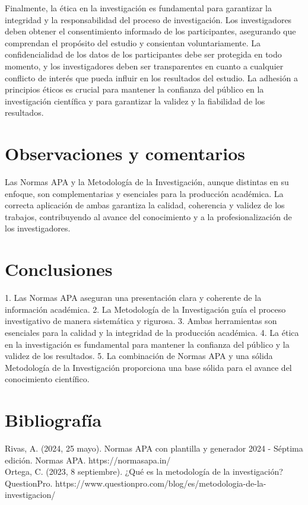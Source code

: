 \documentclass[12pt]{article}
\begin{document}
Finalmente, la ética en la investigación es fundamental para garantizar la integridad y la responsabilidad del proceso de investigación. Los investigadores deben obtener el consentimiento informado de los participantes, asegurando que comprendan el propósito del estudio y consientan voluntariamente. La confidencialidad de los datos de los participantes debe ser protegida en todo momento, y los investigadores deben ser transparentes en cuanto a cualquier conflicto de interés que pueda influir en los resultados del estudio. La adhesión a principios éticos es crucial para mantener la confianza del público en la investigación científica y para garantizar la validez y la fiabilidad de los resultados.

\section*{Observaciones y comentarios}
Las Normas APA y la Metodología de la Investigación, aunque distintas en su enfoque, son complementarias y esenciales para la producción académica. La correcta aplicación de ambas garantiza la calidad, coherencia y validez de los trabajos, contribuyendo al avance del conocimiento y a la profesionalización de los investigadores.

\section*{Conclusiones}
1. Las Normas APA aseguran una presentación clara y coherente de la información académica.
2. La Metodología de la Investigación guía el proceso investigativo de manera sistemática y rigurosa.
3. Ambas herramientas son esenciales para la calidad y la integridad de la producción académica.
4. La ética en la investigación es fundamental para mantener la confianza del público y la validez de los resultados.
5. La combinación de Normas APA y una sólida Metodología de la Investigación proporciona una base sólida para el avance del conocimiento científico.

\section*{Bibliografía}
Rivas, A. (2024, 25 mayo). Normas APA con plantilla y generador 2024 - Séptima edición. Normas APA. https://normasapa.in/\\
Ortega, C. (2023, 8 septiembre). ¿Qué es la metodología de la investigación? QuestionPro. https://www.questionpro.com/blog/es/metodologia-de-la-investigacion/
\end{document}
